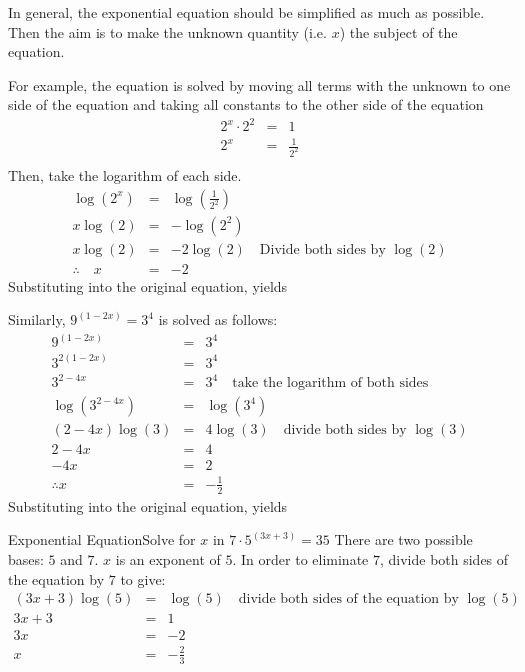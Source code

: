 In general, the exponential equation should be simplified as much as possible. Then the aim is to make the unknown quantity (i.e. $x$) the subject of the equation.

For example, the equation
is solved by moving all terms with the unknown to one side of the equation and taking all constants to the other side of the equation
\begin{eqnarray*}
2^x\cdot2^2&=&1\\
2^x &=&\frac{1}{2^2}\\
\end{eqnarray*}
Then, take the logarithm of each side. 
\begin{eqnarray*}
\log{(2^x)} &=&\log\left(\frac{1}{2^2}\right)\\
x\log{(2)} &=&-\log{(2^2)}\\
x\log{(2)} &=&-2\log{(2)} \quad \mbox{Divide both sides by $\log{(2)}$}\\
\therefore \quad x&=&-2
\end{eqnarray*}
Substituting into the original equation, yields

Similarly, $9^{(1-2x)}=3^4$ is solved as follows:
\begin{eqnarray*}
9^{(1-2x)}&=&3^4\\
3^{2(1-2x)}&=&3^4\\
3^{2-4x}&=&3^4 \quad \mbox{take the logarithm of both sides}\\
\log(3^{2-4x})&=&\log(3^4)\\
(2-4x)\log(3)&=&4\log(3) \quad \mbox{divide both sides by $\log(3)$}\\
2-4x&=&4\\
-4x&=&2\\
\therefore x&=&-\frac{1}{2}
\end{eqnarray*}
Substituting into the original equation, yields

\begin{wex}{Exponential Equation}{Solve for $x$ in $7 \cdot 5^{(3x+3)}=35$}{
There are two possible bases: $5$ and $7$. $x$ is an exponent of $5$.
In order to eliminate $7$, divide both sides of the equation by $7$ to give:
\begin{eqnarray*}
(3x+3)\log(5)&=&\log(5)\quad \mbox{divide both sides of the equation by $\log(5)$}\\
3x+3&=&1\\
3x&=&-2\\
x&=&-\frac{2}{3}
\end{eqnarray*}
}\end{wex}


